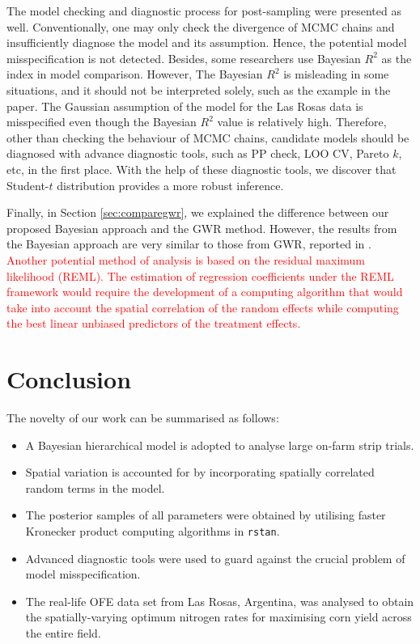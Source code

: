 \documentclass[a4paper]{article}   	%
\newcommand{\rstan}{\texttt{rstan}}
\begin{document}
	
	
	The model checking and diagnostic process for post-sampling were presented as well. Conventionally, one may only check the divergence of MCMC chains and insufficiently diagnose the model and its assumption. Hence, the potential model misspecification is not detected. Besides, some researchers use Bayesian $R^2$ as the index in model comparison. However, The Bayesian $R^2$ is misleading in some situations, and it should not be interpreted solely, such as the example in the paper. The Gaussian assumption of the model for the Las Rosas data is misspecified even though the Bayesian $R^2$ value is relatively high. Therefore, other than checking the behaviour of MCMC chains, candidate models should be diagnosed with advance diagnostic tools, such as PP check, LOO CV, Pareto $k$, etc, in the first place. With the help of these diagnostic tools, we discover that Student-$t$ distribution provides a more robust inference. 
	
	
	
	Finally, in Section \ref{sec:comparegwr}, we explained the difference between our proposed Bayesian approach and the GWR method. However, the results from the Bayesian approach are very similar to those from GWR, reported in \textcite{Rakshit2020Novel}. \textcolor{red}{Another potential method of analysis is based on the residual maximum likelihood (REML). The estimation of regression coefficients under the REML framework would require the development of a computing algorithm that would take into account the spatial correlation of the random effects while computing the best linear unbiased predictors of the treatment effects.}
	
	
	\section{Conclusion}
	
	The novelty of our work can be summarised as follows:
	\begin{itemize}
		\item A Bayesian hierarchical model is adopted to analyse large on-farm strip trials.
		\item Spatial variation is accounted for by   incorporating spatially correlated random terms in the model.
		\item The posterior samples of all parameters were obtained by utilising faster Kronecker product computing algorithms in \rstan.
		\item Advanced diagnostic tools were used to guard against the crucial problem of model misspecification.
		\item The real-life OFE data set from Las Rosas, Argentina, was analysed to obtain the spatially-varying optimum nitrogen rates for maximising corn yield across the entire field.
	\end{itemize}
	
\end{document}

